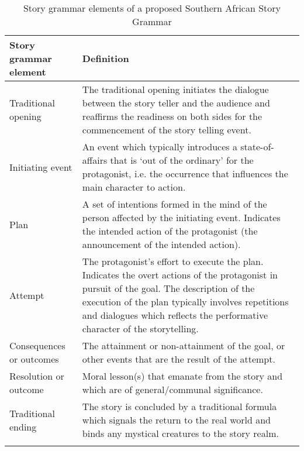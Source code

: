 \documentclass[output=paper,modfonts]{langscibook}
\begin{document}
\begin{table}
\begin{tabularx}{\textwidth}{lX}
\lsptoprule
{\bfseries Story grammar element} & {\bfseries Definition}\\
\midrule
{{Traditional opening}} & {The traditional opening initiates the dialogue between the story teller and the audience and reaffirms the readiness on both sides for the commencement of the story telling event.}\\
{{Initiating event}} & {An event which typically introduces a state-of-affairs that is ‘out of the ordinary’ for the protagonist, i.e. the occurrence that influences the main character to action.}\\
{{Plan}} & {A set of intentions formed in the mind of the person affected by the initiating event. Indicates the intended action of the protagonist (the announcement of the intended action).}\\
{{Attempt}} & {The protagonist’s effort to execute the plan. Indicates the overt actions of the protagonist in pursuit of the goal. The description of the execution of the plan typically involves repetitions and dialogues which reflects the performative character of the storytelling.}\\
{{Consequences or outcomes}} & {The attainment or non-attainment of the goal, or other events that are the result of the attempt.}\\
{{Resolution or outcome}} & {Moral lesson(s) that emanate from the story and which are of general/communal significance.}\\
{{Traditional ending}} & {The story is concluded by a traditional formula which signals the return to the real world and binds any mystical creatures to the story realm.}\\
\lspbottomrule
\end{tabularx} 
\caption{Story grammar elements of a proposed Southern African Story Grammar}
\label{tab:tappe:2}
\end{table} 
\end{document}

